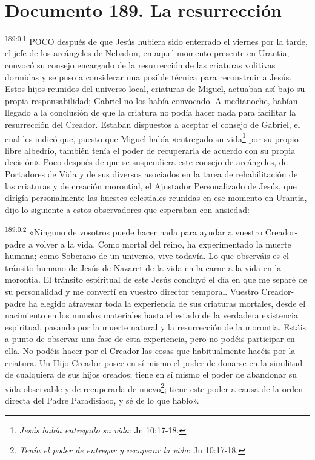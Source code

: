\chapter{Documento 189. La resurrección}
\par
\textsuperscript{189:0.1} POCO después de que Jesús hubiera sido enterrado el viernes por la tarde, el jefe de los arcángeles de Nebadon, en aquel momento presente en Urantia, convocó su consejo encargado de la resurrección de las criaturas volitivas dormidas y se puso a considerar una posible técnica para reconstruir a Jesús. Estos hijos reunidos del universo local, criaturas de Miguel, actuaban así bajo su propia responsabilidad; Gabriel no los había convocado. A medianoche, habían llegado a la conclusión de que la criatura no podía hacer nada para facilitar la resurrección del Creador. Estaban dispuestos a aceptar el consejo de Gabriel, el cual les indicó que, puesto que Miguel había «entregado su vida\footnote{\textit{Jesús había entregado su vida}: Jn 10:17-18.} por su propio libre albedrío, también tenía el poder de recuperarla de acuerdo con su propia decisión». Poco después de que se suspendiera este consejo de arcángeles, de Portadores de Vida y de sus diversos asociados en la tarea de rehabilitación de las criaturas y de creación morontial, el Ajustador Personalizado de Jesús, que dirigía personalmente las huestes celestiales reunidas en ese momento en Urantia, dijo lo siguiente a estos observadores que esperaban con ansiedad:

\par
\textsuperscript{189:0.2} «Ninguno de vosotros puede hacer nada para ayudar a vuestro Creador-padre a volver a la vida. Como mortal del reino, ha experimentado la muerte humana; como Soberano de un universo, vive todavía. Lo que observáis es el tránsito humano de Jesús de Nazaret de la vida en la carne a la vida en la morontia. El tránsito espiritual de este Jesús concluyó el día en que me separé de su personalidad y me convertí en vuestro director temporal. Vuestro Creador-padre ha elegido atravesar toda la experiencia de sus criaturas mortales, desde el nacimiento en los mundos materiales hasta el estado de la verdadera existencia espiritual, pasando por la muerte natural y la resurrección de la morontia. Estáis a punto de observar una fase de esta experiencia, pero no podéis participar en ella. No podéis hacer por el Creador las cosas que habitualmente hacéis por la criatura. Un Hijo Creador posee en sí mismo el poder de donarse en la similitud de cualquiera de sus hijos creados; tiene en sí mismo el poder de abandonar su vida observable y de recuperarla de nuevo\footnote{\textit{Tenía el poder de entregar y recuperar la vida}: Jn 10:17-18.}; tiene este poder a causa de la orden directa del Padre Paradisiaco, y sé de lo que hablo».

